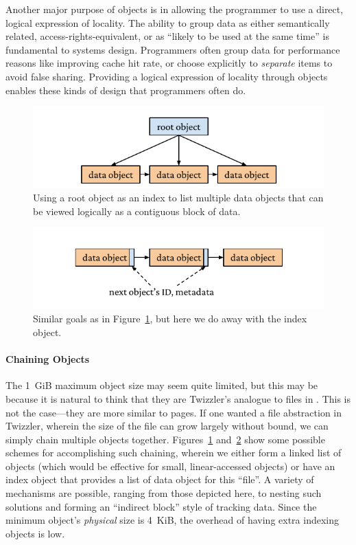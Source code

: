 Another major purpose of objects is in allowing the programmer to use a direct, logical expression of locality.
The ability to group data as either semantically related, access-rights-equivalent, or as ``likely to be used at the
same time'' is fundamental to systems design. Programmers often group data for performance reasons like improving cache
hit rate, or choose explicitly to \emph{separate} items to avoid false sharing. Providing a logical expression of
locality through objects enables these kinds of design that programmers often do.
\begin{figure}
    \centering
    \includegraphics[width=\linewidth]{fig/objectchain1.pdf}
    \caption[Chaining objects]{Using a root object as an index to list multiple data objects that can be viewed logically as a contiguous block of data.}
    \label{fig:objchain1}
\end{figure}

\begin{figure}
    \centering
    \includegraphics[width=\linewidth]{fig/objectchain2.pdf}
    \caption[Alternative object chaining]{Similar goals as in Figure~\ref{fig:objchain1}, but here we do away with the index object.}
    \label{fig:objchain2}
\end{figure}
\paragraph{Chaining Objects}
The 1~GiB maximum object size may seem quite limited, but this may be because it is natural to think that they are
Twizzler's analogue to files in \unix. This is not the case---they are more similar to pages. If one wanted a
file abstraction in Twizzler, wherein the size of the file can grow largely without bound, we can simply chain multiple
objects together. Figures~\ref{fig:objchain1} and~\ref{fig:objchain2} show some possible schemes for accomplishing such
chaining, wherein we either form a linked list of objects (which would be effective for small, linear-accessed objects)
or have an index object that provides a list of data object for this ``file''. A variety of mechanisms are possible,
ranging from those depicted here, to nesting such solutions and forming an ``indirect block'' style of tracking data.
Since the minimum object's \emph{physical} size is 4~KiB, the overhead of having extra indexing objects is low.



